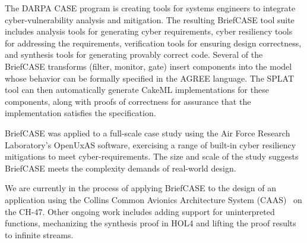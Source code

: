 The DARPA CASE program is creating tools for systems engineers to integrate cyber-vulnerability analysis and mitigation. The resulting BriefCASE tool suite includes analysis tools for generating cyber requirements, cyber resiliency tools for addressing the requirements, verification tools for ensuring design correctness, and synthesis tools for generating provably correct code. Several of the BriefCASE transforms (filter, monitor, gate) insert components into the model whose behavior can be formally specified in the AGREE language.
The SPLAT tool can then automatically generate CakeML implementations for these components, along with proofs of correctness for assurance that the implementation satisfies the specification.

BriefCASE was applied to a full-scale case study using the Air Force Research Laboratory's OpenUxAS software, exercising a range of built-in cyber resiliency mitigations to meet cyber-requirements. 
The size and scale of the study suggests BriefCASE meets the complexity demands of real-world design.

We are currently in the process of applying BriefCASE to the design of an application using the Collins Common Avionics Architecture System (CAAS)~\cite{caas} on the CH-47.  Other ongoing work includes adding support for uninterpreted functions, mechanizing the synthesis proof in HOL4 and lifting the proof results to infinite streams.